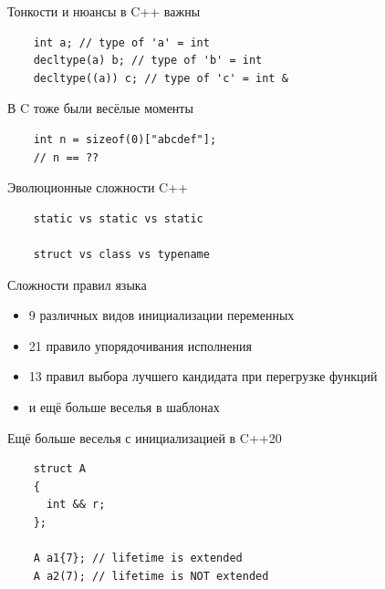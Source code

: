 \documentclass[unknownkeysallowed,xcolor=table]{beamer}
\begin{document}
\begin{frame}[fragile]{Тонкости и нюансы в C++ важны}
  \begin{lstlisting}
    int a; // type of 'a' = int
    decltype(a) b; // type of 'b' = int
    decltype((a)) c; // type of 'c' = int &
  \end{lstlisting}
\end{frame}

\begin{frame}[fragile]{В C тоже были весёлые моменты}
  \begin{lstlisting}
    int n = sizeof(0)["abcdef"];
    // n == ??
  \end{lstlisting}
\end{frame}

\begin{frame}[fragile]{Эволюционные сложности C++}
  \begin{lstlisting}
    static vs static vs static

    struct vs class vs typename
  \end{lstlisting}
\end{frame}

\begin{frame}{Сложности правил языка}
  \begin{itemize}
    \item 9 различных видов инициализации переменных \vspace{2em}
    \item 21 правило упорядочивания исполнения \vspace{2em}
    \item 13 правил выбора лучшего кандидата при перегрузке функций \vspace{2em}
    \item и ещё больше веселья в шаблонах
  \end{itemize}
\end{frame}

\begin{frame}[fragile]{Ещё больше веселья с инициализацией в C++20}
  \begin{lstlisting}
    struct A
    {
      int && r;
    };

    A a1{7}; // lifetime is extended
    A a2(7); // lifetime is NOT extended
  \end{lstlisting}
\end{frame}
\end{document}
